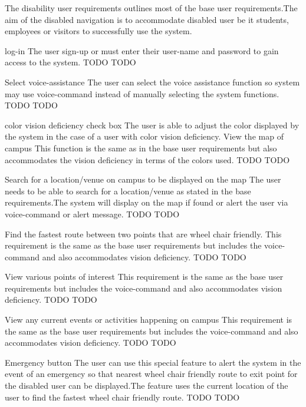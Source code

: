 The disability user requirements outlines most of the base user requirements.The aim of the disabled navigation is to accommodate disabled user be it students, employees or visitors to successfully use the system.

\FuncReq 
{log-in }
{The user sign-up or must enter their user-name and password to gain access to the system. }
 {TODO}
 {TODO}

\FuncReq
{Select voice-assistance }
{The user can select the voice assistance function so system may use voice-command instead of manually selecting the system functions.}
{TODO}
{TODO}

\FuncReq
{ color vision deficiency check box}
{The user is able to adjust the color displayed by the system in the case of a user with color vision deficiency.}
\FuncReq
{View the map of campus}
{This function is the same as in the base user requirements but also accommodates the vision deficiency in terms of the colors used.}
{TODO}
{TODO}

\FuncReq
{Search for a location/venue on campus to be displayed on the map}
{The user needs to be able to search for a location/venue as stated in the base requirements.The system will display on the map if found or alert the user via voice-command or alert message.}
{TODO}
{TODO}

\FuncReq
{Find the fastest route between two points that are wheel chair friendly.}%
{
  This requirement is the same as the base user requirements but includes the voice-command and also accommodates vision deficiency.
}
{TODO}
{TODO}

\FuncReq
{View various points of interest}
{This requirement is the same as the base user requirements but includes the voice-command and also accommodates vision deficiency.}
{TODO}
{TODO}

\FuncReq
{View any current events or activities happening on campus}
{This requirement is the same as the base user requirements but includes the voice-command and also accommodates vision deficiency.}
{TODO}
{TODO}

\FuncReq
{Emergency button }
{The user can use this special feature to alert the system in the event of an emergency so that nearest wheel chair friendly route to exit point for the disabled user can be displayed.The feature uses the current location of the user to find the fastest wheel chair friendly route.}
{TODO}
{TODO}
